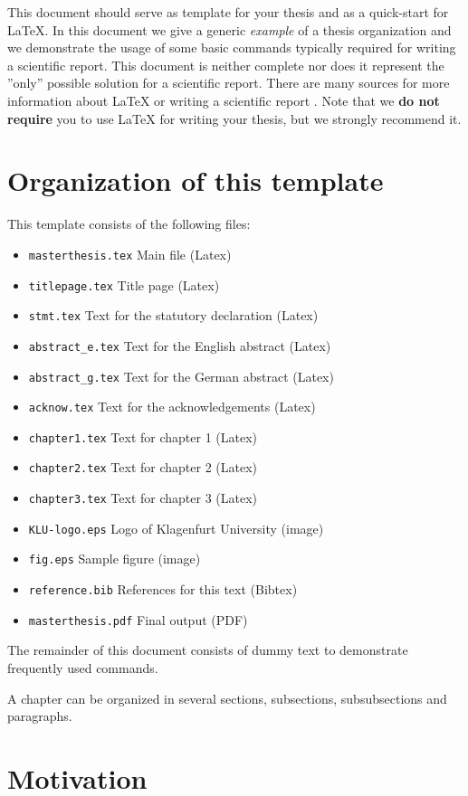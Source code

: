 This document should serve as template for your thesis and as a quick-start for {\LaTeX}.  In this document we give a generic {\em example} of a thesis organization and we demonstrate the usage of some basic commands typically required for writing a scientific report.  This document is neither complete nor does it represent the ''only'' possible solution for a scientific report.  There are many sources for more information about {\LaTeX} \cite{weinelt} or writing a scientific report \cite{Day2006}.
Note that we {\bf do not require} you to use {\LaTeX} for writing your thesis, but we strongly recommend it. 

\section*{Organization of this template}
This template consists of the following files:
\begin{itemize}
\item{\tt masterthesis.tex} Main file (Latex) 
\item{\tt titlepage.tex} Title page (Latex)
\item{\tt stmt.tex} Text for the statutory declaration (Latex)
\item{\tt abstract\_e.tex} Text for the English abstract (Latex)
\item{\tt abstract\_g.tex} Text for the German abstract (Latex)
\item{\tt acknow.tex} Text for the acknowledgements (Latex)
\item{\tt chapter1.tex} Text for chapter 1 (Latex)
\item{\tt chapter2.tex} Text for chapter 2 (Latex)
\item{\tt chapter3.tex} Text for chapter 3 (Latex)
\item{\tt KLU-logo.eps} Logo of Klagenfurt University (image)
\item{\tt fig.eps} Sample figure (image)
\item{\tt reference.bib} References for this text (Bibtex)
\item{\tt masterthesis.pdf} Final output (PDF)
\end{itemize}

\newpage
\noindent
The remainder of this document consists of dummy text to demonstrate frequently used commands.

A chapter can be organized in several sections, subsections, subsubsections and paragraphs.

\section{Motivation}

